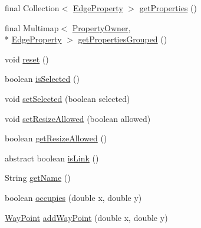 \begin{DoxyCompactItemize}
\item 
final Collection$<$ \hyperlink{classorg_1_1tzi_1_1use_1_1gui_1_1views_1_1diagrams_1_1elements_1_1_edge_property}{Edge\-Property} $>$ \hyperlink{classorg_1_1tzi_1_1use_1_1gui_1_1views_1_1diagrams_1_1elements_1_1edges_1_1_edge_base_ab2e15700d6a1e60a177665e65fb06c9b}{get\-Properties} ()
\item 
final Multimap$<$ \hyperlink{enumorg_1_1tzi_1_1use_1_1gui_1_1views_1_1diagrams_1_1elements_1_1edges_1_1_edge_base_1_1_property_owner}{Property\-Owner}, \\*
\hyperlink{classorg_1_1tzi_1_1use_1_1gui_1_1views_1_1diagrams_1_1elements_1_1_edge_property}{Edge\-Property} $>$ \hyperlink{classorg_1_1tzi_1_1use_1_1gui_1_1views_1_1diagrams_1_1elements_1_1edges_1_1_edge_base_a63a836b456f2fb5966a501f290e80260}{get\-Properties\-Grouped} ()
\item 
void \hyperlink{classorg_1_1tzi_1_1use_1_1gui_1_1views_1_1diagrams_1_1elements_1_1edges_1_1_edge_base_af9d1236f9e957d2b6bfdb6cce5e1be0d}{reset} ()
\item 
boolean \hyperlink{classorg_1_1tzi_1_1use_1_1gui_1_1views_1_1diagrams_1_1elements_1_1edges_1_1_edge_base_aad3f699c83e93f95745a305a10bc77c0}{is\-Selected} ()
\item 
void \hyperlink{classorg_1_1tzi_1_1use_1_1gui_1_1views_1_1diagrams_1_1elements_1_1edges_1_1_edge_base_a02ddd33ba47171cce93230bbadd87e7b}{set\-Selected} (boolean selected)
\item 
void \hyperlink{classorg_1_1tzi_1_1use_1_1gui_1_1views_1_1diagrams_1_1elements_1_1edges_1_1_edge_base_a9e488ead96aad872afd2fd7a29e098d8}{set\-Resize\-Allowed} (boolean allowed)
\item 
boolean \hyperlink{classorg_1_1tzi_1_1use_1_1gui_1_1views_1_1diagrams_1_1elements_1_1edges_1_1_edge_base_a1a7c786be7fe02ca198f2159e6451aa3}{get\-Resize\-Allowed} ()
\item 
abstract boolean \hyperlink{classorg_1_1tzi_1_1use_1_1gui_1_1views_1_1diagrams_1_1elements_1_1edges_1_1_edge_base_a1034e85f6bb3c01b002738b240a09bb4}{is\-Link} ()
\item 
String \hyperlink{classorg_1_1tzi_1_1use_1_1gui_1_1views_1_1diagrams_1_1elements_1_1edges_1_1_edge_base_ae59c05e46b1ecf19d4d1047d4f020fe2}{get\-Name} ()
\item 
boolean \hyperlink{classorg_1_1tzi_1_1use_1_1gui_1_1views_1_1diagrams_1_1elements_1_1edges_1_1_edge_base_a024e7d5d7824f93d061b876c6ab9938e}{occupies} (double x, double y)
\item 
\hyperlink{classorg_1_1tzi_1_1use_1_1gui_1_1views_1_1diagrams_1_1waypoints_1_1_way_point}{Way\-Point} \hyperlink{classorg_1_1tzi_1_1use_1_1gui_1_1views_1_1diagrams_1_1elements_1_1edges_1_1_edge_base_a60da9454f7cbb261b2943aff1f7df8fa}{add\-Way\-Point} (double x, double y)

\end{DoxyCompactItemize}
